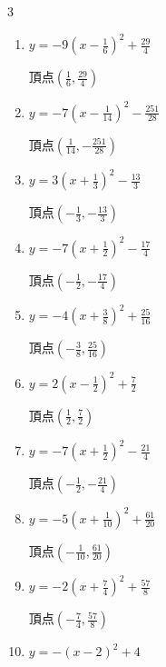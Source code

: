 \begin{multicols}{3}
\begin{enumerate}
        $\displaystyle 頂点\left( \frac{3}{2} , \frac{3}{4} \right)$

  \item $\displaystyle y=-9\left( x-\frac{1}{6}\right)^{2}+\frac{29}{4}$

        $\displaystyle 頂点\left( \frac{1}{6} , \frac{29}{4} \right)$

  \item $\displaystyle y=-7\left( x-\frac{1}{14}\right)^{2}-\frac{251}{28}$

        $\displaystyle 頂点\left( \frac{1}{14} , -\frac{251}{28} \right)$

  \item $\displaystyle y=3\left( x+\frac{1}{3}\right)^{2}-\frac{13}{3}$

        $\displaystyle 頂点\left( -\frac{1}{3} , -\frac{13}{3} \right)$

  \item $\displaystyle y=-7\left( x+\frac{1}{2}\right)^{2}-\frac{17}{4}$

        $\displaystyle 頂点\left( -\frac{1}{2} , -\frac{17}{4} \right)$

  \item $\displaystyle y=-4\left( x+\frac{3}{8}\right)^{2}+\frac{25}{16}$

        $\displaystyle 頂点\left( -\frac{3}{8} , \frac{25}{16} \right)$

\columnbreak %

  \item $\displaystyle y=2\left( x-\frac{1}{2}\right)^{2}+\frac{7}{2}$

        $\displaystyle 頂点\left( \frac{1}{2} , \frac{7}{2} \right)$

  \item $\displaystyle y=-7\left( x+\frac{1}{2}\right)^{2}-\frac{21}{4}$

        $\displaystyle 頂点\left( -\frac{1}{2} , -\frac{21}{4} \right)$

  \item $\displaystyle y=-5\left( x+\frac{1}{10}\right)^{2}+\frac{61}{20}$

        $\displaystyle 頂点\left( -\frac{1}{10} , \frac{61}{20} \right)$

  \item $\displaystyle y=-2\left( x+\frac{7}{4}\right)^{2}+\frac{57}{8}$

        $\displaystyle 頂点\left( -\frac{7}{4} , \frac{57}{8} \right)$

  \item $\displaystyle y=-\left( x-2\right)^{2}+4$


\end{enumerate}
\end{multicols}
